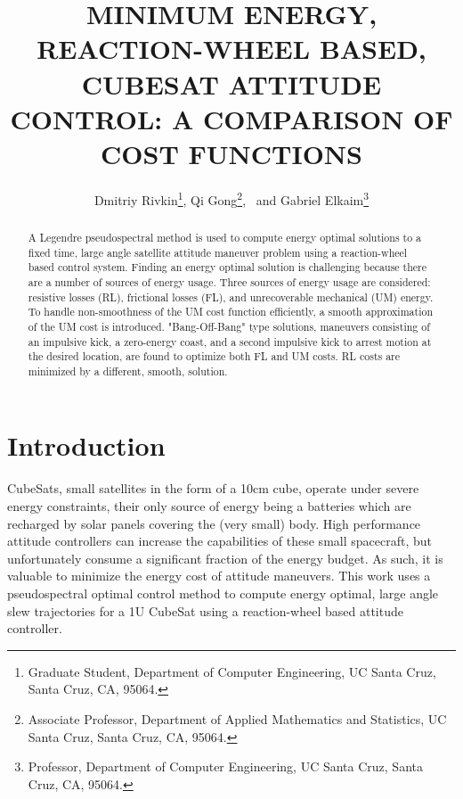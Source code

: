 \documentclass[letterpaper, paper,11pt]{AAS}		%
\begin{document}
\title{MINIMUM ENERGY, REACTION-WHEEL BASED, CUBESAT ATTITUDE CONTROL: A COMPARISON OF COST FUNCTIONS}

\author{Dmitriy Rivkin\thanks{Graduate Student, Department of Computer Engineering, UC Santa Cruz, Santa Cruz, CA, 95064.},  
Qi Gong\thanks{Associate Professor, Department of Applied Mathematics and Statistics, UC Santa Cruz, Santa Cruz, CA, 95064.},
\ and Gabriel Elkaim\thanks{Professor, Department of Computer Engineering, UC Santa Cruz, Santa Cruz, CA, 95064.}
}


\maketitle{} 		


\begin{abstract}
A Legendre pseudospectral method is used to compute energy optimal solutions to a fixed time, large angle satellite attitude maneuver problem using a reaction-wheel based control system. Finding an energy optimal solution is challenging because there are a number of sources of energy usage. Three sources of energy usage are considered: resistive losses (RL), frictional losses (FL), and unrecoverable mechanical (UM) energy. To handle non-smoothness of the UM cost function efficiently, a smooth approximation of the UM cost is introduced. "Bang-Off-Bang" type solutions, maneuvers consisting of an impulsive kick, a zero-energy coast, and a second impulsive kick to arrest motion at the desired location, are found to optimize both FL and UM costs. RL costs are minimized by a different, smooth, solution.
\end{abstract}


\section{Introduction}
CubeSats, small satellites in the form of a 10cm cube, operate under severe energy constraints, their only source of energy being a batteries which are recharged by solar panels covering the (very small) body. High performance attitude controllers can increase the capabilities of these small spacecraft, but unfortunately consume a significant fraction of the energy budget. As such, it is valuable to minimize the energy cost of attitude maneuvers. This work uses a pseudospectral optimal control method to compute energy optimal, large angle slew trajectories for a 1U CubeSat using a reaction-wheel based attitude controller. 
\end{document}
